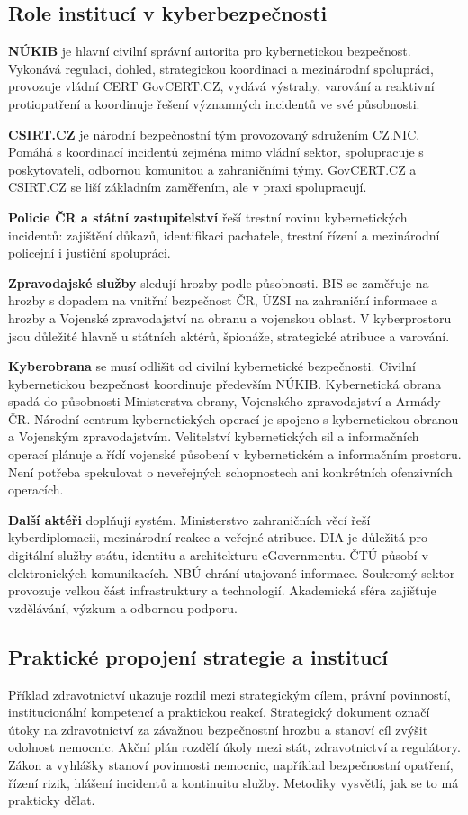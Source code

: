 \documentclass[11pt,a4paper]{article}
\begin{document}
\subsection*{Role institucí v kyberbezpečnosti}
\textbf{NÚKIB} je hlavní civilní správní autorita pro kybernetickou bezpečnost. Vykonává regulaci, dohled, strategickou koordinaci a mezinárodní spolupráci, provozuje vládní CERT GovCERT.CZ, vydává výstrahy, varování a reaktivní protiopatření a koordinuje řešení významných incidentů ve své působnosti.

\textbf{CSIRT.CZ} je národní bezpečnostní tým provozovaný sdružením CZ.NIC. Pomáhá s koordinací incidentů zejména mimo vládní sektor, spolupracuje s poskytovateli, odbornou komunitou a zahraničními týmy. GovCERT.CZ a CSIRT.CZ se liší základním zaměřením, ale v praxi spolupracují.

\textbf{Policie ČR a státní zastupitelství} řeší trestní rovinu kybernetických incidentů: zajištění důkazů, identifikaci pachatele, trestní řízení a mezinárodní policejní i justiční spolupráci.

\textbf{Zpravodajské služby} sledují hrozby podle působnosti. BIS se zaměřuje na hrozby s dopadem na vnitřní bezpečnost ČR, ÚZSI na zahraniční informace a hrozby a Vojenské zpravodajství na obranu a vojenskou oblast. V kyberprostoru jsou důležité hlavně u státních aktérů, špionáže, strategické atribuce a varování.

\textbf{Kyberobrana} se musí odlišit od civilní kybernetické bezpečnosti. Civilní kybernetickou bezpečnost koordinuje především NÚKIB. Kybernetická obrana spadá do působnosti Ministerstva obrany, Vojenského zpravodajství a Armády ČR. Národní centrum kybernetických operací je spojeno s kybernetickou obranou a Vojenským zpravodajstvím. Velitelství kybernetických sil a informačních operací plánuje a řídí vojenské působení v kybernetickém a informačním prostoru. Není potřeba spekulovat o neveřejných schopnostech ani konkrétních ofenzivních operacích.

\textbf{Další aktéři} doplňují systém. Ministerstvo zahraničních věcí řeší kyberdiplomacii, mezinárodní reakce a veřejné atribuce. DIA je důležitá pro digitální služby státu, identitu a architekturu eGovernmentu. ČTÚ působí v elektronických komunikacích. NBÚ chrání utajované informace. Soukromý sektor provozuje velkou část infrastruktury a technologií. Akademická sféra zajišťuje vzdělávání, výzkum a odbornou podporu.

\subsection*{Praktické propojení strategie a institucí}
Příklad zdravotnictví ukazuje rozdíl mezi strategickým cílem, právní povinností, institucionální kompetencí a praktickou reakcí. Strategický dokument označí útoky na zdravotnictví za závažnou bezpečnostní hrozbu a stanoví cíl zvýšit odolnost nemocnic. Akční plán rozdělí úkoly mezi stát, zdravotnictví a regulátory. Zákon a vyhlášky stanoví povinnosti nemocnic, například bezpečnostní opatření, řízení rizik, hlášení incidentů a kontinuitu služby. Metodiky vysvětlí, jak se to má prakticky dělat.
\end{document}

